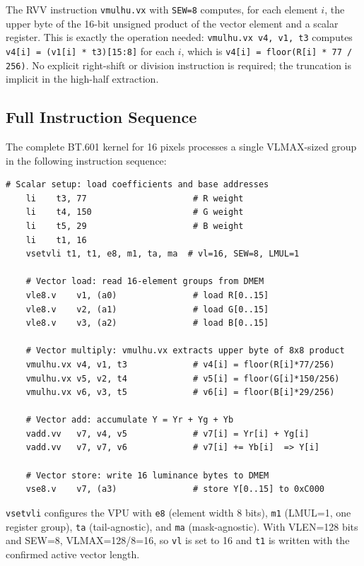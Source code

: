 The RVV instruction \texttt{vmulhu.vx} with \texttt{SEW=8} computes, for each element
$i$, the upper byte of the 16-bit unsigned product of the vector element and a scalar
register. This is exactly the operation needed: \texttt{vmulhu.vx v4, v1, t3}
computes \texttt{v4[i] = (v1[i] * t3)[15:8]} for each $i$, which is
\texttt{v4[i] = floor(R[i] * 77 / 256)}. No explicit right-shift or division instruction
is required; the truncation is implicit in the high-half extraction.

\subsection{Full Instruction Sequence}

The complete BT.601 kernel for 16 pixels processes a single VLMAX-sized group in the
following instruction sequence:

\begin{lstlisting}[language=RISCV, caption={BT.601 grayscale VPU kernel: 16 pixels per iteration at SEW=8 LMUL=1}]
    # Scalar setup: load coefficients and base addresses
    li    t3, 77                     # R weight
    li    t4, 150                    # G weight
    li    t5, 29                     # B weight
    li    t1, 16
    vsetvli t1, t1, e8, m1, ta, ma  # vl=16, SEW=8, LMUL=1

    # Vector load: read 16-element groups from DMEM
    vle8.v    v1, (a0)               # load R[0..15]
    vle8.v    v2, (a1)               # load G[0..15]
    vle8.v    v3, (a2)               # load B[0..15]

    # Vector multiply: vmulhu.vx extracts upper byte of 8x8 product
    vmulhu.vx v4, v1, t3             # v4[i] = floor(R[i]*77/256)
    vmulhu.vx v5, v2, t4             # v5[i] = floor(G[i]*150/256)
    vmulhu.vx v6, v3, t5             # v6[i] = floor(B[i]*29/256)

    # Vector add: accumulate Y = Yr + Yg + Yb
    vadd.vv   v7, v4, v5             # v7[i] = Yr[i] + Yg[i]
    vadd.vv   v7, v7, v6             # v7[i] += Yb[i]  => Y[i]

    # Vector store: write 16 luminance bytes to DMEM
    vse8.v    v7, (a3)               # store Y[0..15] to 0xC000
\end{lstlisting}

\texttt{vsetvli} configures the VPU with \texttt{e8} (element width 8 bits),
\texttt{m1} (LMUL=1, one register group), \texttt{ta} (tail-agnostic), and \texttt{ma}
(mask-agnostic). With VLEN=128 bits and SEW=8, VLMAX=128/8=16, so \texttt{vl} is set
to 16 and \texttt{t1} is written with the confirmed active vector length.

